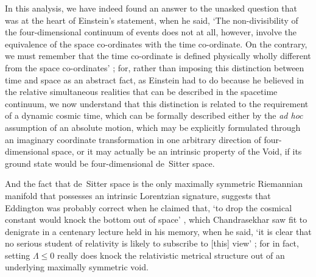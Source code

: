 In this analysis, we have indeed found an answer to the unasked question that was at the heart of Einstein's statement, when he said, `The non-divisibility of the four-dimensional continuum of events does not at all, however, involve the equivalence of the space co-ordinates with the time co-ordinate. On the contrary, we must remember that the time co-ordinate is defined physically wholly different from the space co-ordinates' \cite{Einstein1945}; for, rather than imposing this distinction between time and space as an abstract fact, as Einstein had to do because he believed in the relative simultaneous realities that can be described in the spacetime continuum, we now understand that this distinction is related to the requirement of a dynamic cosmic time, which can be formally described either by the \textit{ad hoc} assumption of an absolute motion, which may be explicitly formulated through an imaginary coordinate transformation in one arbitrary direction of four-dimensional space, or it may actually be an intrinsic property of the Void, if its ground state would be four-dimensional de~Sitter space.

And the fact that de~Sitter space is the only maximally symmetric Riemannian manifold that possesses an intrinsic Lorentzian signature, suggests that Eddington was probably correct when he claimed that, `to drop the cosmical constant would knock the bottom out of space' \cite{Eddington1933}, which Chandrasekhar saw fit to denigrate in a centenary lecture held in his memory, when he said, `it is clear that no serious student of relativity is likely to subscribe to [this] view' \cite{Chandrasekhar1983}; for in fact, setting $\Lambda\leq0$ really does knock the relativistic metrical structure out of an underlying maximally symmetric void.

